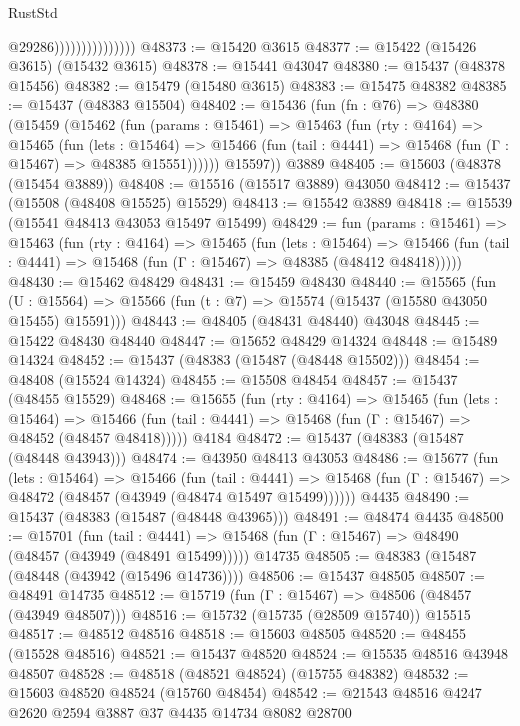 \begin{lexlean}{RustStd}
\begin{coremodule}
                                  @29286)))))))))))))))
@48373 := @15420 @3615
@48377 := @15422 (@15426 @3615) (@15432 @3615)
@48378 := @15441 @43047
@48380 := @15437 (@48378 @15456)
@48382 := @15479 (@15480 @3615)
@48383 := @15475 @48382
@48385 := @15437 (@48383 @15504)
@48402 := @15436
    (fun (fn : @76) =>
    @48380
      (@15459
        (@15462
          (fun (params : @15461) =>
          @15463
            (fun (rty : @4164) =>
            @15465
              (fun (lets : @15464) =>
              @15466 (fun (tail : @4441) => @15468 (fun (Γ : @15467) => @48385 @15551))))))
        @15597))
    @3889
@48405 := @15603 (@48378 (@15454 @3889))
@48408 := @15516 (@15517 @3889) @43050
@48412 := @15437 (@15508 (@48408 @15525) @15529)
@48413 := @15542 @3889
@48418 := @15539 (@15541 @48413 @43053 @15497 @15499)
@48429 := fun (params : @15461) =>
  @15463
    (fun (rty : @4164) =>
    @15465
      (fun (lets : @15464) =>
      @15466 (fun (tail : @4441) => @15468 (fun (Γ : @15467) => @48385 (@48412 @48418)))))
@48430 := @15462 @48429
@48431 := @15459 @48430
@48440 := @15565
    (fun (U : @15564) => @15566 (fun (t : @7) => @15574 (@15437 (@15580 @43050 @15455) @15591)))
@48443 := @48405 (@48431 @48440) @43048
@48445 := @15422 @48430 @48440
@48447 := @15652 @48429 @14324
@48448 := @15489 @14324
@48452 := @15437 (@48383 (@15487 (@48448 @15502)))
@48454 := @48408 (@15524 @14324)
@48455 := @15508 @48454
@48457 := @15437 (@48455 @15529)
@48468 := @15655
    (fun (rty : @4164) =>
    @15465
      (fun (lets : @15464) =>
      @15466 (fun (tail : @4441) => @15468 (fun (Γ : @15467) => @48452 (@48457 @48418)))))
    @4184
@48472 := @15437 (@48383 (@15487 (@48448 @43943)))
@48474 := @43950 @48413 @43053
@48486 := @15677
    (fun (lets : @15464) =>
    @15466
      (fun (tail : @4441) =>
      @15468 (fun (Γ : @15467) => @48472 (@48457 (@43949 (@48474 @15497 @15499))))))
    @4435
@48490 := @15437 (@48383 (@15487 (@48448 @43965)))
@48491 := @48474 @4435
@48500 := @15701
    (fun (tail : @4441) => @15468 (fun (Γ : @15467) => @48490 (@48457 (@43949 (@48491 @15499)))))
    @14735
@48505 := @48383 (@15487 (@48448 (@43942 (@15496 @14736))))
@48506 := @15437 @48505
@48507 := @48491 @14735
@48512 := @15719 (fun (Γ : @15467) => @48506 (@48457 (@43949 @48507)))
@48516 := @15732 (@15735 (@28509 @15740)) @15515
@48517 := @48512 @48516
@48518 := @15603 @48505
@48520 := @48455 (@15528 @48516)
@48521 := @15437 @48520
@48524 := @15535 @48516 @43948 @48507
@48528 := @48518 (@48521 @48524) (@15755 @48382)
@48532 := @15603 @48520 @48524 (@15760 @48454)
@48542 := @21543 @48516 @4247 @2620 @2594 @3887 @37 @4435 @14734 @8082 @28700

\end{coremodule}
\end{lexlean}
